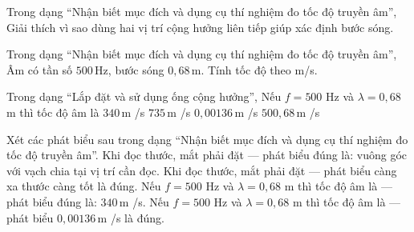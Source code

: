 \begin{ex}
Trong dạng “Nhận biết mục đích và dụng cụ thí nghiệm đo tốc độ truyền âm”, Giải thích vì sao dùng hai vị trí cộng hưởng liên tiếp giúp xác định bước sóng.
\choiceTF

\end{ex}

\begin{ex}
Trong dạng “Nhận biết mục đích và dụng cụ thí nghiệm đo tốc độ truyền âm”, Âm có tần số $500\,\text{Hz}$, bước sóng $0,68\,\text{m}$. Tính tốc độ theo m/s.
\end{ex}

\begin{ex}
Trong dạng “Lắp đặt và sử dụng ống cộng hưởng”, Nếu $f=500$ Hz và $\lambda=0,68$ m thì tốc độ âm là
\choice
{\True $340\,\text{m}$ /s}
{$735\,\text{m}$ /s}
{$0,00136\,\text{m}$ /s}
{$500,68\,\text{m}$ /s}
\end{ex}

\begin{ex}
Xét các phát biểu sau trong dạng “Nhận biết mục đích và dụng cụ thí nghiệm đo tốc độ truyền âm”.
\choiceTF
{\True Khi đọc thước, mắt phải đặt — phát biểu đúng là: vuông góc với vạch chia tại vị trí cần đọc.}
{Khi đọc thước, mắt phải đặt — phát biểu càng xa thước càng tốt là đúng.}
{\True Nếu $f=500$ Hz và $\lambda=0,68$ m thì tốc độ âm là — phát biểu đúng là: $340\,\text{m}$ /s.}
{Nếu $f=500$ Hz và $\lambda=0,68$ m thì tốc độ âm là — phát biểu $0,00136\,\text{m}$ /s là đúng.}
\end{ex}

